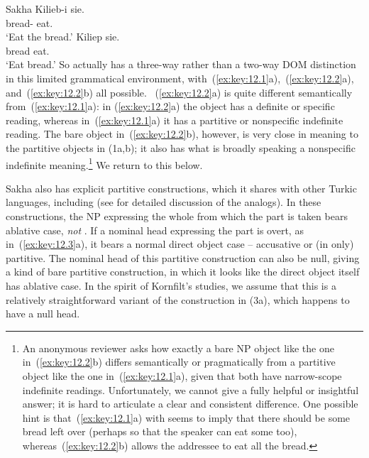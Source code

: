 \documentclass[output=paper]{langsci/langscibook}
\begin{document}
\ea\label{ex:key:12.2}Sakha
	\ea
		\gll Kilieb-i  sie.\\
			bread-\Acc{}  eat.\Imp{}\\
		\glt ‘Eat the bread.’
	\ex
		\gll Kiliep  sie.\\
			bread eat.\Imp{}\\
		\glt ‘Eat bread.’
	\z
\z
So  actually has a three-way rather than a two-way
\gls{DOM} distinction in this limited
grammatical environment, with~(\ref{ex:key:12.1}a),~(\ref{ex:key:12.2}a),
and~(\ref{ex:key:12.2}b) all possible. ~(\ref{ex:key:12.2}a) is quite different
semantically from~(\ref{ex:key:12.1}a): in (\ref{ex:key:12.2}a) the object has
a definite or specific reading, whereas in~(\ref{ex:key:12.1}a) it has a
partitive or nonspecific indefinite reading. The bare object
in~(\ref{ex:key:12.2}b), however, is very close in meaning to the
partitive objects in (1a,b); it also has what is broadly
speaking a nonspecific indefinite meaning.\footnote{An anonymous reviewer asks
    how exactly a bare NP object like the one in~(\ref{ex:key:12.2}b) differs
    semantically or pragmatically from a partitive object
    like the one in~(\ref{ex:key:12.1}a), given that both have narrow-scope
    indefinite readings.  Unfortunately, we cannot give a fully helpful or
    insightful answer; it is hard to articulate a clear and consistent
    difference.  One possible hint is that~(\ref{ex:key:12.1}a) with
     seems to imply that there should be some bread left
    over (perhaps so that the speaker can eat some too),
    whereas~(\ref{ex:key:12.2}b) allows the addressee to eat all the bread.}
    We return to this below.

Sakha also has explicit partitive constructions, which it shares with other
Turkic languages, including  (see
\citealt{Kornfilt1990,Kornfilt1996} for
detailed discussion of the  analogs). In these constructions, the
NP expressing the whole from which the part is taken bears ablative case,
\emph{not} . If a nominal head expressing the part is
overt, as in~(\ref{ex:key:12.3}a), it bears a normal direct object
case -- accusative or (in  only) partitive. The nominal head of
this partitive construction can also be null, giving a kind of bare partitive
construction, in which it looks like the direct object itself has ablative
case. In the spirit of Kornfilt’s studies, we assume that this is a relatively
straightforward variant of the construction in (3a), which happens to have a
null head.
\end{document}
